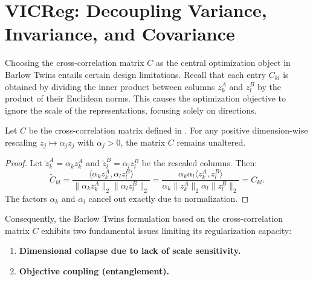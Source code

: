 \documentclass[11pt, oneside, openany]{book}
\begin{document}
\section{VICReg: Decoupling Variance, Invariance, and Covariance}
\label{sec:5.3}

Choosing the cross-correlation matrix $C$ as the central optimization object in Barlow Twins entails certain design limitations. Recall that each entry $C_{kl}$ is obtained by dividing the inner product between columns $z_{k}^{A}$ and $z_{l}^{B}$ by the product of their Euclidean norms. This causes the optimization objective to ignore the scale of the representations, focusing solely on directions.

\begin{proposition}
\label{prop:5.2}
Let $C$ be the cross-correlation matrix defined in . For any positive dimension-wise rescaling $z_{j} \mapsto \alpha_{j} z_{j}$ with $\alpha_{j} > 0$, the matrix $C$ remains unaltered.
\end{proposition}

\begin{proof}
Let $\tilde{z}_{k}^{A} = \alpha_{k} z_{k}^{A}$ and $\tilde{z}_{l}^{B} = \alpha_{l} z_{l}^{B}$ be the rescaled columns. Then:
\begin{equation}
\label{eq:5.21}
\tilde{C}_{kl} = \frac{\langle \alpha_{k} z_{k}^{A}, \alpha_{l} z_{l}^{B} \rangle}{\lVert \alpha_{k} z_{k}^{A} \rVert_{2} \lVert \alpha_{l} z_{l}^{B} \rVert_{2}} = \frac{\alpha_{k} \alpha_{l} \langle z_{k}^{A}, z_{l}^{B} \rangle}{\alpha_{k} \lVert z_{k}^{A} \rVert_{2} \alpha_{l} \lVert z_{l}^{B} \rVert_{2}} = C_{kl}.
\end{equation}
The factors $\alpha_{k}$ and $\alpha_{l}$ cancel out exactly due to normalization.
\end{proof}

Consequently, the Barlow Twins formulation based on the cross-correlation matrix $C$ exhibits two fundamental issues limiting its regularization capacity:
\begin{enumerate}
    \item \textbf{Dimensional collapse due to lack of scale sensitivity.}
    \item \textbf{Objective coupling (entanglement).}
\end{enumerate}
\end{document}
